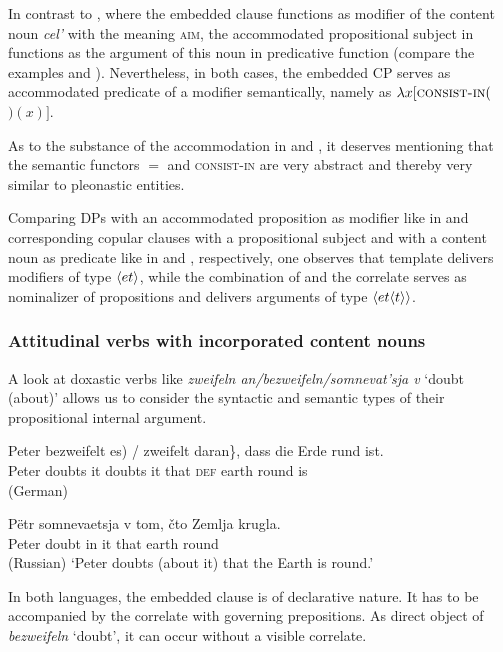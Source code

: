 \documentclass[output=paper,
colorlinks,
citecolor=brown,
newtxmath
]{langscibook}
\begin{document}
\noindent In contrast to , where the embedded clause functions as modifier of the content noun \textit{cel'} with the meaning \textsc{aim}, the accommodated propositional subject in  functions as the argument of this noun in predicative function (compare the examples  and ). Nevertheless, in both cases, the embedded CP serves as accommodated predicate of a modifier semantically, namely as $\lambda x [\textsc{consist-in} ($$) (x)]$.

As to the substance of the accommodation in  and , it deserves mentioning that the semantic functors $=$ and \textsc{consist-in} are very abstract and thereby very similar to pleonastic entities.

Comparing DPs with an accommodated proposition as modifier like in  and corresponding copular clauses with a propositional subject and with a content noun as predicate like in  and , respectively, one observes that template  delivers modifiers of type $\langle{et}\rangle$, while the combination of  and the correlate  serves as nominalizer of propositions and delivers arguments of type $\langle{et\ensuremath{\langle{t}\rangle}}\rangle$.


\subsubsection{Attitudinal verbs with incorporated content nouns}\label{s:2.4.2}

A look at doxastic verbs like \textit{zweifeln an/bezweifeln/somnevat'sja v} `doubt (about)' allows us to consider the syntactic and semantic types of their propositional internal argument.

\ea\label{ex:32}
    \ea \gll Peter \minsp{\{} bezweifelt \minsp{(} es) / zweifelt daran\}, dass die Erde rund ist. \\
    Peter {} doubts {} it {} doubts it that \textsc{def} earth round is \\ \glt \hfill (German)

    \ex  \gll Pëtr somnevaetsja v tom, čto Zemlja krugla. \\
    Peter doubt in it that earth round \\ \hfill (Russian)
    \z
    \glt `Peter doubts (about it) that the Earth is round.'
\z

\noindent In both languages, the embedded clause is of declarative nature. It has to be accompanied by the correlate with governing prepositions. As direct object of \textit{bezweifeln} `doubt', it can occur without a visible correlate.
\end{document}
